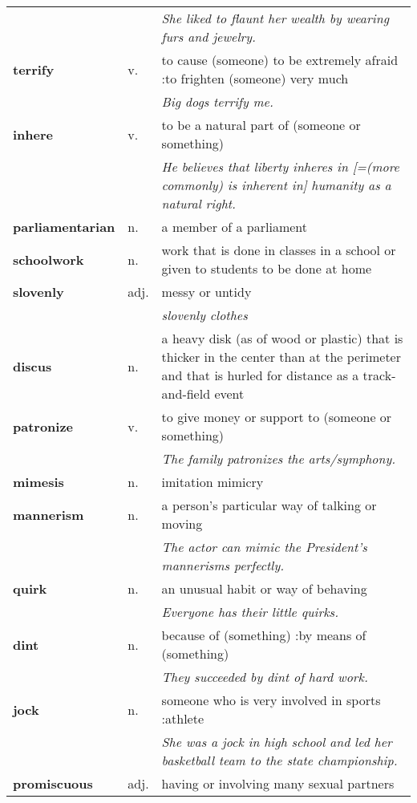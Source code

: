 \documentclass[a4paper]{article}
\begin{document}
\begin{longtable}{llp{11cm}}
 & & \textit{She liked to flaunt her wealth by wearing furs and jewelry.}\\[0.08cm]
\textbf{terrify} & v. &  to cause (someone) to be extremely afraid :to frighten (someone) very much \\
 & & \textit{Big dogs terrify me.}\\[0.08cm]
\textbf{inhere} & v. &  to be a natural part of (someone or something) \\
 & & \textit{He believes that liberty inheres in [=(more commonly) is inherent in] humanity as a natural right.}\\[0.08cm]
\textbf{parliamentarian} & n. &  a member of a parliament\\[0.08cm]
\textbf{schoolwork} & n. &  work that is done in classes in a school or given to students to be done at home \\[0.08cm]
\textbf{slovenly} & adj. &  messy or untidy \\
 & & \textit{slovenly clothes}\\[0.08cm]
\textbf{discus} & n. &  a heavy disk (as of wood or plastic) that is thicker in the center than at the perimeter and that is hurled for distance as a track-and-field event\\[0.08cm]
\textbf{patronize} & v. &  to give money or support to (someone or something) \\
 & & \textit{The family patronizes the arts/symphony.}\\[0.08cm]
\textbf{mimesis} & n. &  imitation mimicry\\[0.08cm]
\textbf{mannerism} & n. &  a person's particular way of talking or moving \\
 & & \textit{The actor can mimic the President's mannerisms perfectly.}\\[0.08cm]
\textbf{quirk} & n. &  an unusual habit or way of behaving \\
 & & \textit{Everyone has their little quirks.}\\[0.08cm]
\textbf{dint} & n. &  because of (something) :by means of (something) \\
 & & \textit{They succeeded by dint of hard work.}\\[0.08cm]
\textbf{jock} & n. &  someone who is very involved in sports :athlete \\
 & & \textit{She was a jock in high school and led her basketball team to the state championship.}\\[0.08cm]
\textbf{promiscuous} & adj. &  having or involving many sexual partners \\

\end{longtable}
\end{document}
